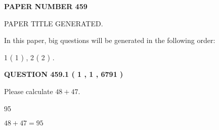 \documentclass[12pt]{article}
\begin{document}
   
   
   
\newpage 
\setcounter{page}{ 
   459001 } 
   
   
   
   
 {\textbf{ \Large{ PAPER NUMBER  459  }}}
   
   
\vspace{0.2in}
   
   
   
   
   
   
   
   
 \vspace{0.2in}
 
 
 
 
   
   
 PAPER TITLE GENERATED.
   
   
   
\vspace{0.2in}
   
In this paper, big questions will be generated in the following order: 
   
   
   1 ( 1 )
 ,
   2 ( 2 )
 .
  
\vspace{0.2in}
  
{\textbf{\Large{QUESTION
459.1 
 ( 1 , 1 , 6791 )
}}}
  
  
 
Please calculate $ %
48 +  %
47 $.
 
 
 
\noindent{}
 
 

95
 
 
\noindent{}
 
 

 
 
 
\noindent{}
 
 

$ %
48 +  %
47=   %
95$
 
 
\noindent{}
 
 

 
   
   
   
\end{document}
